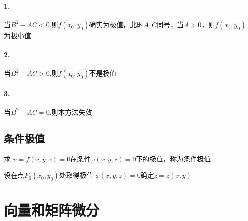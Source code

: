 \documentclass{ctexart}
\begin{document}
      \paragraph{1.}当$B^2 - AC < 0 $,则$f(x_0,y_0)$确实为极值，此时$A,C$同号，当$ A > 0$，则$f(x_0,y_0)$为极小值
      \paragraph{2.}当$B^2 - AC > 0 $,则$f(x_0,y_0)$不是极值
      \paragraph{3.}当$B^2 - AC = 0 $,则本方法失效

      \subsection{条件极值}
      求 $u = f(x,y,z)=0$在条件$\varphi(x,y,z) = 0$下的极值，称为条件极值

      设在点$P_0(x_0,y_0)$处取得极值
      $\phi (x,y,z) = 0$确定$z = z(x,y)$

  \section{向量和矩阵微分}
\end{document}
